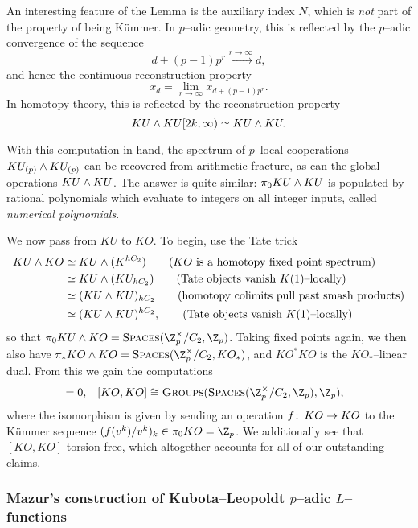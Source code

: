 \begin{remark}
An interesting feature of the Lemma is the auxiliary index \(N\), which is \emph{not} part of the property of being K\"ummer.  In \(p\)--adic geometry, this is reflected by the \(p\)--adic convergence of the sequence \[d + (p-1)p^r \xrightarrow{r \to \infty} d,\] and hence the continuous reconstruction property \[x_d = \lim_{r \to \infty} x_{d + (p-1)p^r}.\]  In homotopy theory, this is reflected by the reconstruction property \[KU \wedge KU[2k, \infty) \simeq KU \wedge KU.\]
\end{remark}

\begin{remark}
With this computation in hand, the spectrum of \(p\)--local cooperations \(KU_{(p)} \wedge KU_{(p)}\) can be recovered from arithmetic fracture, as can the global operations \(KU \wedge KU\).  The answer is quite similar: \(\pi_0 KU \wedge KU\) is populated by rational polynomials which evaluate to integers on all integer inputs, called \textit{numerical polynomials}.
\end{remark}

We now pass from \(KU\) to \(KO\).  To begin, use the Tate trick
\begin{align*}
KU \wedge KO & \simeq KU \wedge (K^{hC_2}) \tag{\(KO\) is a homotopy fixed point spectrum} \\
& \simeq KU \wedge (KU_{hC_2}) \tag{Tate objects vanish \(K(1)\)--locally} \\
& \simeq (KU \wedge KU)_{hC_2} \tag{homotopy colimits pull past smash products} \\
& \simeq (KU \wedge KU)^{hC_2}, \tag{Tate objects vanish \(K(1)\)--locally}
\end{align*}
so that \(\pi_0 KU \sm KO = \CatOf{Spaces}(\Z_p^\times / C_2, \Z_p)\).  Taking fixed points again, we then also have \(\pi_* KO \sm KO = \CatOf{Spaces}(\Z_p^\times / C_2, KO_*)\), and \(KO^* KO\) is the \(KO_*\)--linear dual.  From this we gain the computations
\begin{align*}
[\Susp^{-1} KO, KO] & = 0, &
[KO, KO] & \cong \CatOf{Groups}(\CatOf{Spaces}(\Z_p^\times / C_2, \Z_p), \Z_p),
\end{align*}
where the isomorphism is given by sending an operation $f\colon\thinspace KO \to KO$ to the K\"ummer sequence $(f(v^k)/v^k)_k \in \pi_0 KO = \Z_p$.  We additionally see that \([KO, KO]\) torsion-free, which altogether accounts for all of our outstanding claims.


\subsubsection{Mazur's construction of Kubota--Leopoldt \(p\)--adic \(L\)--functions}

